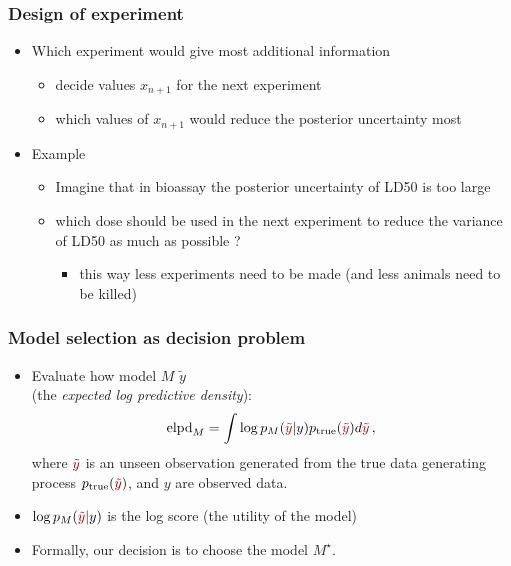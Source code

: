 \documentclass[10pt,handout]{beamer}
\begin{document}
\begin{frame}

\frametitle{Design of experiment}

  \begin{itemize}
  \item Which experiment would give most additional information
    \begin{itemize}
    \item decide values $x_{n+1}$ for the next experiment
    \item which values of $x_{n+1}$ would reduce the posterior uncertainty most
    \end{itemize}
  \item Example
    \begin{itemize}
    \item Imagine that in bioassay the posterior uncertainty of LD50 is too large
    \item which dose should be used in the next experiment to reduce
      the variance of LD50 as much as possible ?
      \begin{itemize}
        \item this way less experiments need to be made (and less animals need to be killed)
      \end{itemize}
    \end{itemize}
  \end{itemize}
\end{frame}


\begin{frame}

\frametitle{Model selection as decision problem}

\begin{itemize}
\item Evaluate how model $M$  $\tilde{y}$\\(the \emph{expected log predictive density}):
\[
\text{elpd}_M= \int \log p_M({\color{uured}\tilde{y}}|y) p_\text{true}({\color{uured}\tilde{y}}) d{\color{uured}\tilde{y}}\,,
\]
where ${\color{uured}\tilde{y}}$ is an unseen observation generated from the true data generating process $p_\text{true}({\color{uured}\tilde{y}})$, and $y$ are observed data.
\item $\log p_M({\color{uured}\tilde{y}}|y)$ is the log score (the utility of the model)
\pause
\item Formally, our decision is to choose the model $M^\star$.
\end{itemize}

\end{frame}
\end{document}
